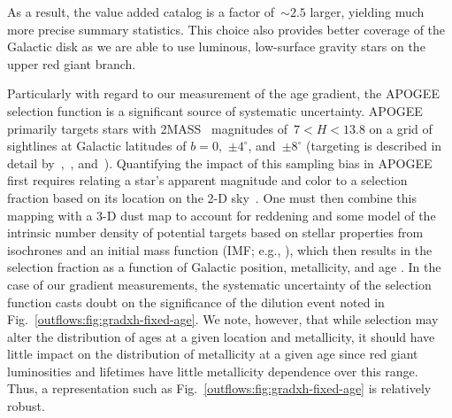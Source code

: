 As a result, the value added catalog is a factor of~$\sim$$2.5$ larger,
yielding much more precise summary statistics.
This choice  also provides better coverage of the Galactic disk as we are able
to use luminous, low-surface gravity stars on the upper red giant branch.
\par
Particularly with regard to our measurement of the age gradient, the APOGEE
selection function is a significant source of systematic uncertainty.
APOGEE primarily targets stars with 2MASS~\citep{Skrutskie2006} magnitudes
of~$7 < H < 13.8$ on a grid of sightlines at Galactic latitudes of
$b = 0$,~$\pm 4^\circ$, and~$\pm 8^\circ$ (targeting is described in detail
by~\citealt{Zasowski2013, Zasowski2017},~\citealt{Beaton2021},
and~\citealt{Santana2021}).
Quantifying the impact of this sampling bias in APOGEE first requires relating
a star's apparent magnitude and color to a selection fraction based on its
location on the 2-D sky~\citep{Bovy2016c, Mackereth2017, Lian2022}.
One must then combine this mapping with a 3-D dust map to account for reddening
and some model of the intrinsic number density of potential targets based on
stellar properties from isochrones and an initial mass function (IMF; e.g.,
\citealt{Kroupa2001, Chabrier2003}), which then results in the selection
fraction as a function of Galactic position, metallicity, and age
\citep[see also][]{Mackereth2020}.
In the case of our gradient measurements, the systematic uncertainty of the
selection function casts doubt on the significance of the dilution event
noted in Fig.~\ref{outflows:fig:gradxh-fixed-age}.
We note, however, that while selection may alter the distribution of ages at a
given location and metallicity, it should have little impact on the
distribution of metallicity at a given age since red giant luminosities and
lifetimes have little metallicity dependence over this range.
Thus, a representation such as Fig.~\ref{outflows:fig:gradxh-fixed-age} is
relatively robust.






